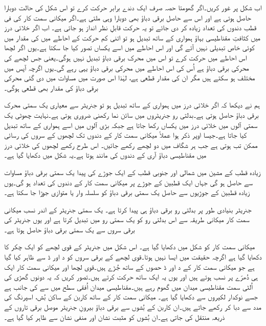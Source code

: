 اب شکل  پر غور کریں۔اگر گھومتا حصہ صرف ایک دندے برابر حرکت کرے تو اس شکل کی حالت  دوبارا حاصل ہوتی ہے اور اس سے حاصل برقی دباؤ بھی دوبارا وہی ملتی ہے۔اگر میکانی سمت کار کی فی قطب دندوں کی تعداد زیادہ کر دی جائے تو یہ حرکت قابلِ نظر انداز ہو جاتی ہے۔ اب اگر خلائی درز میں کثافتِ مقناطیسی بہاؤ ہمواری کے ساتھ تبدیل ہو تو اتنی کم حرکت کے احاطے میں  کی مقدار میں کوئی خاص تبدیلی نہیں آئے گی اور اس احاطے میں اسے یکساں تصور کیا جا سکتا ہے۔یوں اگر لچھا اس احاطے میں حرکت کرے تو اس میں محرک برقی دباؤ تبدیل نہیں ہوگی۔یعنی جس لچھے کی محرکی برقی دباؤ  ہے اُس کی اس احاطے میں محرکی برقی دباؤ یہی رہے گی۔یوں اگرچہ  آپس میں مختلف ہو سکتے ہیں مگر ان کی مقدار قطعی ہے، لہٰذا اس صورت میں مساوات  میں دی گئی محرکی برقی دباؤ کی مقدار بھی قطعی ہوگی۔ 

ہم نے دیکھا کہ اگر خلائی درز میں  ہمواری کے ساتھ تبدیل ہو تو جنریٹر سے معیاری یک سمتی محرک برقی دباؤ حاصل ہوتی ہے۔بدلتی رو جنریٹروں میں  سائن نما رکھنی ضروری ہوتی ہے۔نہایت چھوٹی یک سمتی آلوں میں خلائی درز میں   یکساں رکھا جاتا ہے جبکہ بڑی آلوں میں اسے ہمواری کے ساتھ تبدیل کیا جاتا ہے۔جیسا اوپر ذکر ہوا عملاً میکانی سمت کار کے دندوں تک لچھوں کے سروں کی رسائی ممکن تب ہوتی ہے جب ہر شگاف میں دو لچھے رکھے جائیں۔ اس طرح رکھے لچھوں کی خلائی درز میں مقناطیسی دباؤ آری کے دندوں کی مانند ہوتا ہے۔یہ شکل  میں دکھایا گیا ہے۔

زیادہ قطب کے مشین میں شمالی اور جنوبی قطب کے ایک جوڑے کی پیدا یک سمتی برقی دباؤ مساوات  سے حاصل ہو گی جہاں  ایک قطبین کے جوڑے پر میکانی سمت کار کے دندوں کی تعداد ہو گی۔یوں زیادہ قطبین کے جوڑیوں سے حاصل یک سمتی برقی دباؤ کو سلسلہ وار یا متوازی جوڑا جا سکتا ہے۔

جنریٹر بنیادی طور پر بدلتی رو برقی دباؤ ہی پیدا کرتا ہے۔ یک سمتی جنریٹر کے اندر نسب میکانی سمت کار  میکانی طریقہ سے اس بدلتی رو کو یک سمتی رو میں تبدیل کرتا ہے اور یوں جنریٹر کی برقی سروں سے یک سمتی برقی دباؤ حاصل ہوتا ہے۔

میکانی سمت کار کو شکل  میں دکھایا گیا ہے۔ اس شکل میں جنریٹر کے قوی  لچھے کو ایک چکر کا دکھایا گیا ہے اگرچہ حقیقت میں ایسا نہیں ہوتا۔قوی لچھے کے برقی سروں کو د اور ڈ سے ظاہر کیا گیا ہے جو میکانی سمت کار کے د اور ڈ حصوں کے ساتھ جُڑے ہیں۔قوی لچھا اور میکانی سمت کار ایک ہی دُھرّے پر نسب ہوتے ہیں اور یوں یہ ایک ساتھ حرکت کرتے ہیں۔تصور کریں کہ یہ دونوں گھڑی کی اُلٹی سمت مقناطیسی میدان میں گھوم رہے ہیں۔مقناطیسی میدان  اُفقی سطح میں  سے  کی جانب ہے جسے نوکدار لکیروں سے دکھایا گیا ہے۔ میکانی سمت کار کے ساتھ کاربن کے ساکن بُش، اسپرنگ کی مدد سے دبا کر رکھے جاتے ہیں۔ان کاربن کے بُشوں سے برقی دباؤ بیرونِ جنریٹر موصل برقی تاروں کے ذریعہ منتقل کی جاتی ہے۔ان بُشوں کو مثبت نشان   اور منفی نشان  سے ظاہر کیا گیا ہے۔

